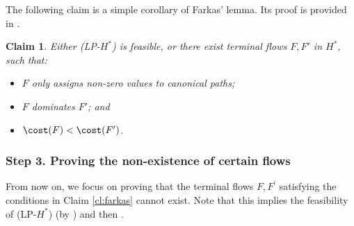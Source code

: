 \documentclass[11pt]{article}
\newtheorem{claim}[theorem]{Claim}
\begin{document}

The following claim is a simple corollary of Farkas' lemma. Its proof is provided in .

\begin{claim}
\label{clm: feasibility or flow}
Either \textnormal{(LP-$H^*$)} is feasible, or    
there exist terminal flows $F,F'$ in $H^*$, such that:
    \begin{itemize}
        \item $F$ only assigns non-zero values to canonical paths;
        \item $F$ dominates $F'$; and
        \item $\cost(F)<\cost(F')$.
    \end{itemize}\label{cl:farkas}
\end{claim}


\subsubsection*{Step 3. Proving the non-existence of certain flows}

From now on, we focus on proving that the terminal flows $F,F^\prime$ satisfying the conditions in Claim \ref{cl:farkas} cannot exist. Note that this implies the feasibility of (LP-$H^*$) (by ) and then .
\end{document}
